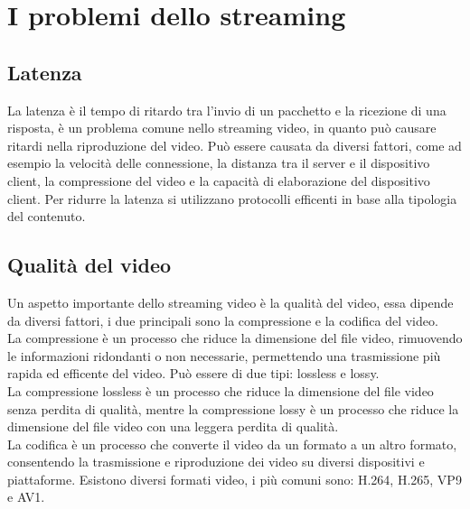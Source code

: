 \section{I problemi dello streaming}
\subsection{Latenza}
La latenza è il tempo di ritardo tra l'invio di un pacchetto e la ricezione di una risposta, è un problema comune nello streaming video, in quanto può causare ritardi nella riproduzione del video.
Può essere causata da diversi fattori, come ad esempio la velocità delle connessione, la distanza tra il server e il dispositivo client, la compressione del video e la capacità di elaborazione del dispositivo client.
Per ridurre la latenza si utilizzano protocolli efficenti in base alla tipologia del contenuto.\\

\subsection{Qualità del video}
Un aspetto importante dello streaming video è la qualità del video, essa dipende da diversi fattori, i due principali sono la compressione e la codifica del video.\\
La compressione è un processo che riduce la dimensione del file video, rimuovendo le informazioni ridondanti o non necessarie, permettendo una trasmissione più rapida ed efficente del video.
Può essere di due tipi: lossless e lossy.\\
La compressione lossless è un processo che riduce la dimensione del file video senza perdita di qualità, mentre la compressione lossy è un processo che riduce
 la dimensione del file video con una leggera perdita di qualità.\\ 

La codifica è un processo che converte il video da un formato a un altro formato, consentendo la trasmissione e riproduzione dei video su diversi dispositivi e piattaforme.
Esistono diversi formati video, i più comuni sono: H.264, H.265, VP9 e AV1.\\


